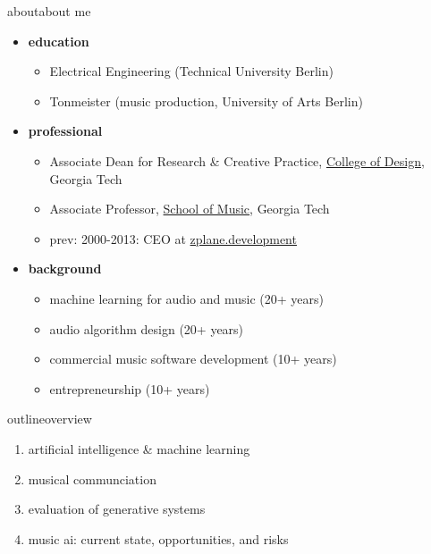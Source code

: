 \begin{frame}{about}{about me}
    \begin{itemize}
        \item   \textbf{education}
            \begin{itemize}
                \item   Electrical Engineering (Technical University Berlin)
                \item   Tonmeister (music production, University of Arts Berlin)
            \end{itemize}
        \bigskip
        \item   \textbf{professional}
            \begin{itemize}
                \item   Associate Dean for Research \& Creative Practice, \href{https://design.gatech.edu}{College of Design}, Georgia Tech 
                \item   Associate Professor, \href{https://music.gatech.edu}{School of Music}, Georgia Tech
                \item   prev: 2000-2013: CEO at \href{https://www.zplane.de}{zplane.development}
            \end{itemize}
        \bigskip
        \item   \textbf{background}
            \begin{itemize}
                \item   machine learning for audio and music (20+ years)
                \item   audio algorithm design (20+ years)
                \item   commercial music software development (10+ years)
                \item   entrepreneurship (10+ years)
            \end{itemize}
    \end{itemize}
    
\end{frame}

{
\begin{frame}{outline}{overview}
    \begin{enumerate}
        \item artificial intelligence \& machine learning
        \item musical communciation
        \item evaluation of generative systems
        \item music ai: current state, opportunities, and risks
    \end{enumerate}
\end{frame}
}

